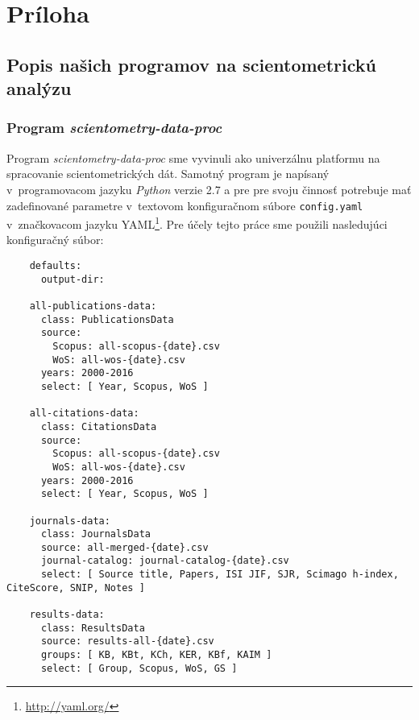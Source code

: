 \chapter*{Príloha}

\section*{Popis našich programov na scientometrickú analýzu}


\subsection*{Program \emph{scientometry-data-proc}}

Program \emph{scientometry-data-proc} sme vyvinuli ako univerzálnu platformu na
spracovanie scientometrických dát.  Samotný program je napísaný v~programovacom
jazyku \emph{Python} verzie 2.7 a pre pre svoju činnosť potrebuje mať
zadefinované parametre v~textovom konfiguračnom súbore \verb|config.yaml|
v~značkovacom jazyku YAML\footnote{\url{http://yaml.org/}}. Pre účely tejto
práce sme použili nasledujúci konfiguračný súbor:

\begin{source}
  \begin{verbatim}
    defaults:
      output-dir:

    all-publications-data:
      class: PublicationsData
      source:
        Scopus: all-scopus-{date}.csv
        WoS: all-wos-{date}.csv
      years: 2000-2016
      select: [ Year, Scopus, WoS ]

    all-citations-data:
      class: CitationsData
      source:
        Scopus: all-scopus-{date}.csv
        WoS: all-wos-{date}.csv
      years: 2000-2016
      select: [ Year, Scopus, WoS ]

    journals-data:
      class: JournalsData
      source: all-merged-{date}.csv
      journal-catalog: journal-catalog-{date}.csv
      select: [ Source title, Papers, ISI JIF, SJR, Scimago h-index, CiteScore, SNIP, Notes ]

    results-data:
      class: ResultsData
      source: results-all-{date}.csv
      groups: [ KB, KBt, KCh, KER, KBf, KAIM ]
      select: [ Group, Scopus, WoS, GS ]
  \end{verbatim}
\end{source}

